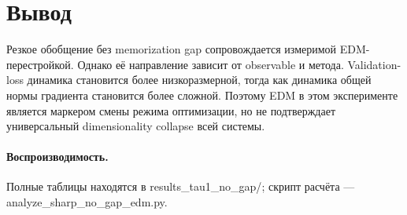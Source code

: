 \documentclass[11pt,a4paper]{article}
\newcommand{\code}[1]{{\fontencoding{T1}\selectfont\ttfamily #1}}
\begin{document}
\section{Вывод}

Резкое обобщение без memorization gap сопровождается измеримой EDM-перестройкой.
Однако её направление зависит от observable и метода. Validation-loss динамика
становится более низкоразмерной, тогда как динамика общей нормы градиента
становится более сложной. Поэтому EDM в этом эксперименте является маркером
смены режима оптимизации, но не подтверждает универсальный dimensionality
collapse всей системы.

\paragraph{Воспроизводимость.}
Полные таблицы находятся в \code{results\_tau1\_no\_gap/}; скрипт расчёта ---
\code{analyze\_sharp\_no\_gap\_edm.py}.
\end{document}
